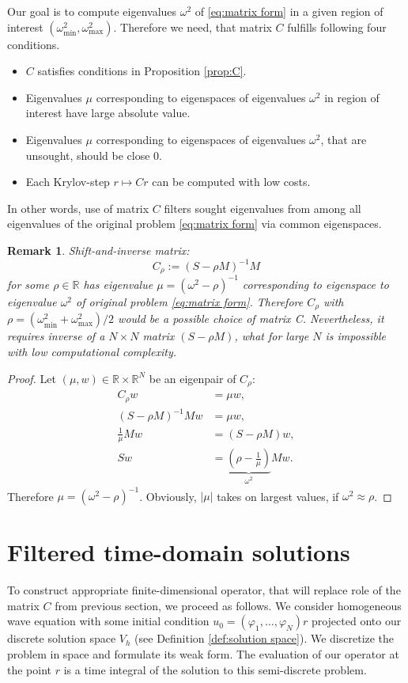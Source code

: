 \documentclass[a4paper,11pt,bibliography=totoc,listof=totoc,headinclude=true,cleardoublepage=empty,oneside]{scrbook}
\newtheorem{rem}[theorem]{Remark}
\newcommand{\R}{\mathbb{R}}
\begin{document}
Our goal is to compute eigenvalues $\omega^2$ of \eqref{eq:matrix form} in a given region of interest $(\omega_{\min}^2, \omega_{\max}^2)$. Therefore we need, that matrix $C$ fulfills following four conditions.
\begin{itemize}
    \item $C$ satisfies conditions in Proposition \ref{prop:C}.
    \item Eigenvalues $\mu$ corresponding to eigenspaces of eigenvalues $\omega^2$ in region of interest have large absolute value.
    \item Eigenvalues $\mu$ corresponding to eigenspaces of eigenvalues $\omega^2$, that are unsought, should be close 0. 
    \item Each Krylov-step $r \mapsto Cr$ can be computed with low costs.
\end{itemize}
In other words, use of matrix $C$ filters sought eigenvalues from among all eigenvalues of the original problem \eqref{eq:matrix form} via common eigenspaces. 

\begin{rem}
    Shift-and-inverse matrix:
    \begin{equation*}
        C_\rho := (S - \rho M)^{-1}M
    \end{equation*}
    for some $\rho \in \R$ has eigenvalue $\mu = (\omega^2 - \rho)^{-1}$ corresponding to eigenspace to eigenvalue $\omega^2$ of original problem \eqref{eq:matrix form}. Therefore $C_\rho$ with $\rho = (\omega^2_{\min}+\omega^2_{\max})/2 $ would be a possible choice of matrix C. Nevertheless, it requires inverse of a $N\times N$ matrix $(S - \rho M)$, what for large $N$ is impossible with low computational complexity.
\end{rem}
\begin{proof}
    Let $(\mu, w)\in \R\times\R^N$ be an eigenpair of $C_\rho$:
    \begin{align*}
        C_\rho w &= \mu w,  \\
        (S - \rho M)^{-1}Mw &= \mu w, \\
        \frac{1}{\mu}Mw &= (S - \rho M)w, \\
        Sw &= \underbrace{\left(\rho - \frac{1}{\mu}\right)}_{\omega^2} Mw. 
    \end{align*}
    Therefore $\mu = (\omega^2 - \rho)^{-1}$. Obviously, $|\mu|$ takes on largest values, if $\omega^2 \approx \rho$.
\end{proof}

\section{Filtered time-domain solutions}
To construct appropriate finite-dimensional operator, that will replace role of the matrix $C$ from previous section, we proceed as follows. We consider homogeneous wave equation with some initial condition $u_0 = (\varphi_1, \dots, \varphi_N)r$ projected onto our discrete solution space $V_h$ (see Definition \ref{def:solution space}). We discretize the problem in space and formulate its weak form. The evaluation of our operator at the point $r$ is a time integral of the solution to this semi-discrete problem.
\end{document}

